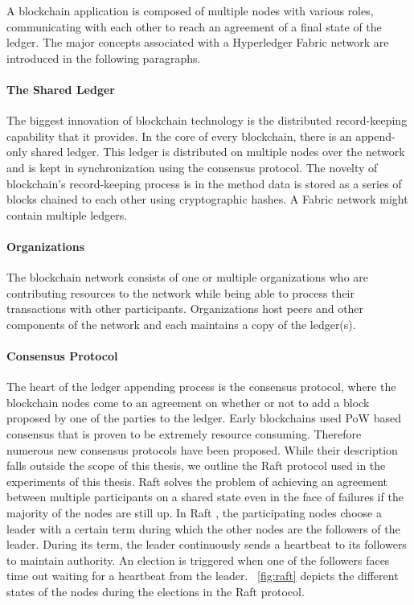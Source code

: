 A blockchain application is composed of multiple nodes with various roles, communicating with each other to reach an agreement of a final state of the ledger. The major concepts associated with a Hyperledger Fabric network are introduced in the following paragraphs.

\paragraph{The Shared Ledger}

The biggest innovation of blockchain technology is the distributed record-keeping capability that it provides. In the core of every blockchain, there is an append-only shared ledger. This ledger is distributed on multiple nodes over the network and is kept in synchronization using the consensus protocol. The novelty of blockchain's record-keeping process is in the method data is stored as a series of blocks chained to each other using cryptographic hashes. A Fabric network might contain multiple ledgers.%

 \paragraph{Organizations}
 
 The blockchain network consists of one or multiple organizations who are contributing resources to the network while being able to process their transactions with other participants. Organizations host peers and other components of the network and each maintains a copy of the ledger(s).

\paragraph{Consensus Protocol}

The heart of the ledger appending process is the consensus protocol, where the blockchain nodes come to an agreement on whether or not to add a block proposed by one of the parties to the ledger. Early blockchains used \ac{PoW} based consensus that is proven to be extremely resource consuming. Therefore numerous new consensus protocols have been proposed. While their description falls outside the scope of this thesis, we outline the Raft protocol \cite{Ongaro:raft} used in the experiments of this thesis. Raft solves the problem of achieving an agreement between multiple participants on a shared state even in the face of failures if the majority of the nodes are still up. In Raft \cite{Ongaro:raft}, the participating nodes choose a leader with a certain term during which the other nodes are the followers of the leader. During its term, the leader continuously sends a heartbeat to its followers to maintain authority. An election is triggered when one of the followers faces time out waiting for a heartbeat from the leader. \figureautorefname~\ref{fig:raft} depicts the different states of the nodes during the elections in the Raft protocol. 

